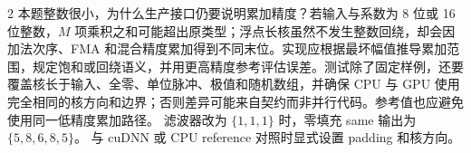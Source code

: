 \begin{solutionexercise}{2}
本题整数很小，为什么生产接口仍要说明累加精度？若输入与系数为 8 位或 16 位整数，$M$ 项乘积之和可能超出原类型；浮点长核虽然不发生整数回绕，却会因加法次序、FMA 和混合精度累加得到不同末位。实现应根据最坏幅值推导累加范围，规定饱和或回绕语义，并用更高精度参考评估误差。测试除了固定样例，还要覆盖核长于输入、全零、单位脉冲、极值和随机数组，并确保 CPU 与 GPU 使用完全相同的核方向和边界；否则差异可能来自契约而非并行代码。参考值也应避免使用同一低精度累加路径。
\variantheading 滤波器改为 $\{1,1,1\}$ 时，零填充 same 输出为 $\{5,8,6,8,5\}$。
\practiceheading 与 cuDNN 或 CPU reference 对照时显式设置 padding 和核方向。
\end{solutionexercise}

